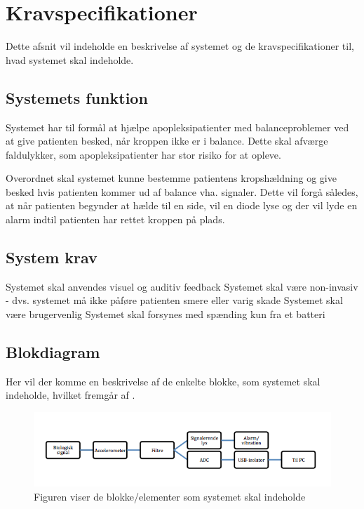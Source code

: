 \section{Kravspecifikationer}
Dette afsnit vil indeholde en beskrivelse af systemet og de kravspecifikationer til, hvad systemet skal indeholde. 

\subsection{Systemets funktion}
Systemet har til formål at hjælpe apopleksipatienter med balanceproblemer ved at give patienten besked, når kroppen ikke er i balance. Dette skal afværge faldulykker, som apopleksipatienter har stor risiko for at opleve.

Overordnet skal systemet kunne bestemme patientens kropshældning og give besked hvis patienten kommer ud af balance vha. signaler. Dette vil forgå således, at når patienten begynder at hælde til en side, vil en diode lyse og der vil lyde en alarm indtil patienten har rettet kroppen på plads. 

\subsection{System krav}
\begin{itemize}
Systemet skal anvendes visuel og auditiv feedback 
Systemet skal være non-invasiv - dvs. systemet må ikke påføre patienten smere eller varig skade
Systemet skal være brugervenlig
Systemet skal forsynes med spænding kun fra et batteri
\end{itemize}

\subsection{Blokdiagram}
Her vil der komme en beskrivelse af de enkelte blokke, som systemet skal indeholde, hvilket fremgår af .

\begin{figure}[H]
	\centering
	\includegraphics[scale=0.8]{figures/bProblemanalyse/Kravspecifikationer - blokdiagram.png}
	\caption{Figuren viser de blokke/elementer som systemet skal indeholde}
	\label{krav_blok}
\end{figure}

